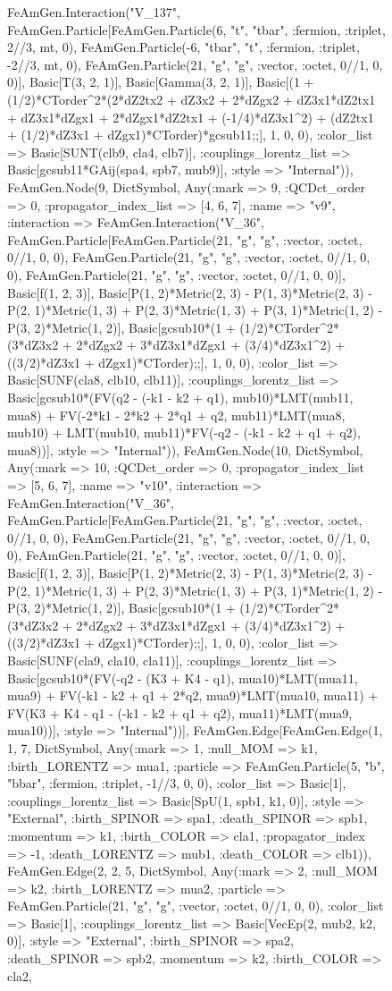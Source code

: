 \documentclass{revtex4}
\begin{document}
\begin{figure}[!htb]
\begin{center}
{FeAmGen.Interaction("V_137", FeAmGen.Particle[FeAmGen.Particle(6, "t", "tbar", :fermion, :triplet, 2//3, mt, 0), FeAmGen.Particle(-6, "tbar", "t", :fermion, :triplet, -2//3, mt, 0), FeAmGen.Particle(21, "g", "g", :vector, :octet, 0//1, 0, 0)], Basic[T(3, 2, 1)], Basic[Gamma(3, 2, 1)], Basic[(1 + (1/2)*CTorder^2*(2*dZ2tx2 + dZ3x2 + 2*dZgx2 + dZ3x1*dZ2tx1 + dZ3x1*dZgx1 + 2*dZgx1*dZ2tx1 + (-1/4)*dZ3x1^2) + (dZ2tx1 + (1/2)*dZ3x1 + dZgx1)*CTorder)*gcsub11;;], 1, 0, 0), :color_list => Basic[SUNT(clb9, cla4, clb7)], :couplings_lorentz_list => Basic[gcsub11*GAij(spa4, spb7, mub9)], :style => "Internal")), FeAmGen.Node(9, Dict{Symbol, Any}(:mark => 9, :QCDct_order => 0, :propagator_index_list => [4, 6, 7], :name => "v9", :interaction => FeAmGen.Interaction("V_36", FeAmGen.Particle[FeAmGen.Particle(21, "g", "g", :vector, :octet, 0//1, 0, 0), FeAmGen.Particle(21, "g", "g", :vector, :octet, 0//1, 0, 0), FeAmGen.Particle(21, "g", "g", :vector, :octet, 0//1, 0, 0)], Basic[f(1, 2, 3)], Basic[P(1, 2)*Metric(2, 3) - P(1, 3)*Metric(2, 3) - P(2, 1)*Metric(1, 3) + P(2, 3)*Metric(1, 3) + P(3, 1)*Metric(1, 2) - P(3, 2)*Metric(1, 2)], Basic[gcsub10*(1 + (1/2)*CTorder^2*(3*dZ3x2 + 2*dZgx2 + 3*dZ3x1*dZgx1 + (3/4)*dZ3x1^2) + ((3/2)*dZ3x1 + dZgx1)*CTorder);;], 1, 0, 0), :color_list => Basic[SUNF(cla8, clb10, clb11)], :couplings_lorentz_list => Basic[gcsub10*(FV(q2 - (-k1 - k2 + q1), mub10)*LMT(mub11, mua8) + FV(-2*k1 - 2*k2 + 2*q1 + q2, mub11)*LMT(mua8, mub10) + LMT(mub10, mub11)*FV(-q2 - (-k1 - k2 + q1 + q2), mua8))], :style => "Internal")), FeAmGen.Node(10, Dict{Symbol, Any}(:mark => 10, :QCDct_order => 0, :propagator_index_list => [5, 6, 7], :name => "v10", :interaction => FeAmGen.Interaction("V_36", FeAmGen.Particle[FeAmGen.Particle(21, "g", "g", :vector, :octet, 0//1, 0, 0), FeAmGen.Particle(21, "g", "g", :vector, :octet, 0//1, 0, 0), FeAmGen.Particle(21, "g", "g", :vector, :octet, 0//1, 0, 0)], Basic[f(1, 2, 3)], Basic[P(1, 2)*Metric(2, 3) - P(1, 3)*Metric(2, 3) - P(2, 1)*Metric(1, 3) + P(2, 3)*Metric(1, 3) + P(3, 1)*Metric(1, 2) - P(3, 2)*Metric(1, 2)], Basic[gcsub10*(1 + (1/2)*CTorder^2*(3*dZ3x2 + 2*dZgx2 + 3*dZ3x1*dZgx1 + (3/4)*dZ3x1^2) + ((3/2)*dZ3x1 + dZgx1)*CTorder);;], 1, 0, 0), :color_list => Basic[SUNF(cla9, cla10, cla11)], :couplings_lorentz_list => Basic[gcsub10*(FV(-q2 - (K3 + K4 - q1), mua10)*LMT(mua11, mua9) + FV(-k1 - k2 + q1 + 2*q2, mua9)*LMT(mua10, mua11) + FV(K3 + K4 - q1 - (-k1 - k2 + q1 + q2), mua11)*LMT(mua9, mua10))], :style => "Internal"))], FeAmGen.Edge[FeAmGen.Edge(1, 1, 7, Dict{Symbol, Any}(:mark => 1, :null_MOM => k1, :birth_LORENTZ => mua1, :particle => FeAmGen.Particle(5, "b", "bbar", :fermion, :triplet, -1//3, 0, 0), :color_list => Basic[1], :couplings_lorentz_list => Basic[SpU(1, spb1, k1, 0)], :style => "External", :birth_SPINOR => spa1, :death_SPINOR => spb1, :momentum => k1, :birth_COLOR => cla1, :propagator_index => -1, :death_LORENTZ => mub1, :death_COLOR => clb1)), FeAmGen.Edge(2, 2, 5, Dict{Symbol, Any}(:mark => 2, :null_MOM => k2, :birth_LORENTZ => mua2, :particle => FeAmGen.Particle(21, "g", "g", :vector, :octet, 0//1, 0, 0), :color_list => Basic[1], :couplings_lorentz_list => Basic[VecEp(2, mub2, k2, 0)], :style => "External", :birth_SPINOR => spa2, :death_SPINOR => spb2, :momentum => k2, :birth_COLOR => cla2, }
\end{center}
\end{figure}
\end{document}
